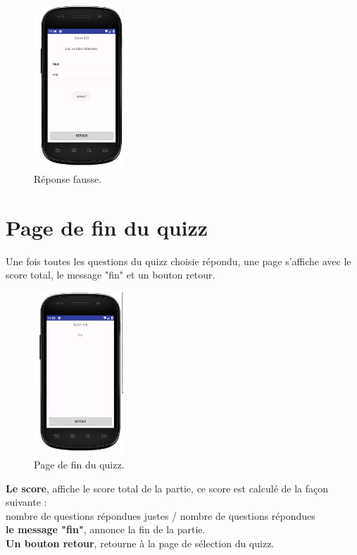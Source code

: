 \documentclass[a4paper]{report}
\begin{document}
\begin{figure}[h]
\centering
\includegraphics[width=0.3\textwidth]{reponseFausse.png}
\caption{\label{fig:Réponse fausse}Réponse fausse.}
\end{figure}


\newpage
\section{Page de fin du quizz}
Une fois toutes les questions du quizz choisie répondu, une page s'affiche avec le score total, le message "fin" et un bouton retour.

\begin{figure}[h]
\centering
\includegraphics[width=0.3\textwidth]{finJeu.png}
\caption{\label{fig:Page de fin du quizz}Page de fin du quizz.}
\end{figure}

\textbf{Le score}, affiche le score total de la partie, ce score est calculé de la façon suivante : \\
nombre de questions répondues justes / nombre de questions répondues \\
\textbf{le message "fin"}, annonce la fin de la partie. \\
\textbf{Un bouton retour}, retourne à la page de sélection du quizz.\\
\end{document}
